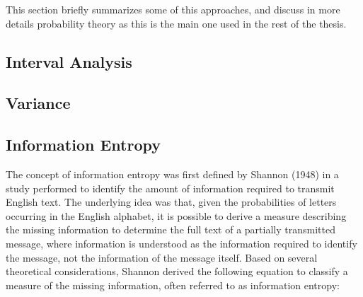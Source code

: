 

This section briefly summarizes some of this approaches, and discuss in more details probability theory as this is the main one used in the rest of the thesis.

\subsection{Interval Analysis}

\subsection{Variance}

\subsection{Information Entropy}
\label{InformationEntropy}
The concept of information entropy was first defined by Shannon (1948) in a study performed to identify the amount of information required to transmit English text. The underlying idea was that, given the probabilities of letters occurring in the English alphabet, it is possible to derive a measure describing the missing information to determine the full text of a partially transmitted message, where information is understood as the information required to identify the message, not the information of the message itself. Based on several theoretical considerations, Shannon derived the following equation to classify a measure of the missing information, often referred to as information entropy:

